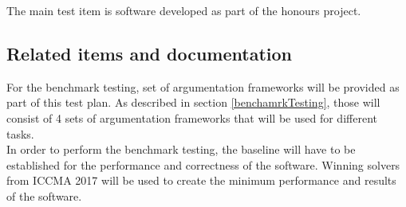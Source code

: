 The main test item is  software developed as part of the honours project. 


\subsection{Related items and documentation}
For the benchmark testing, set of argumentation frameworks will be provided as part of this test plan. As described in section \ref{benchamrkTesting}, those will consist of 4 sets of argumentation frameworks that will be used for different tasks.  
\\
In order to perform the benchmark testing, the baseline will have to be established for the performance and correctness of the software. Winning solvers from ICCMA 2017 will be used to create the minimum performance and results of the software. 
